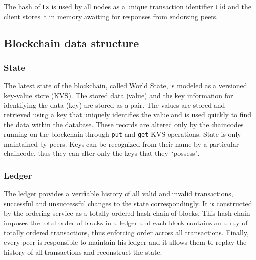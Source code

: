 The hash of \verb|tx| is used by all nodes as a unique transaction identifier \verb|tid| and the client stores it in memory awaiting for responses from endorsing peers.


\subsection{Blockchain data structure}
\subsubsection{State}
The latest state of the blockchain, called World State, is modeled as a versioned key-value store (KVS). The stored data (value) and the key information for identifying the data (key) are stored as a pair. The values are stored and retrieved using a key that uniquely identifies the value and is used quickly to find the data within the database. These records are altered only by the chaincodes running on the blockchain through \verb|put| and \verb|get| KVS-operations.
State is only maintained by peers. Keys can be recognized from their name by a particular chaincode, thus they can alter only the keys that they ``possess".

\subsubsection{Ledger}
The ledger provides a verifiable history of all valid and invalid transactions, successful and unsuccessful changes to the state correspondingly. It is constructed by the ordering service as a totally ordered hash-chain of blocks. This hash-chain imposes the total order of blocks in a ledger and each block contains an array of totally ordered transactions, thus enforcing order across all transactions. Finally, every peer is responsible to maintain his ledger and it allows them to replay the history of all transactions and reconstruct the state.

